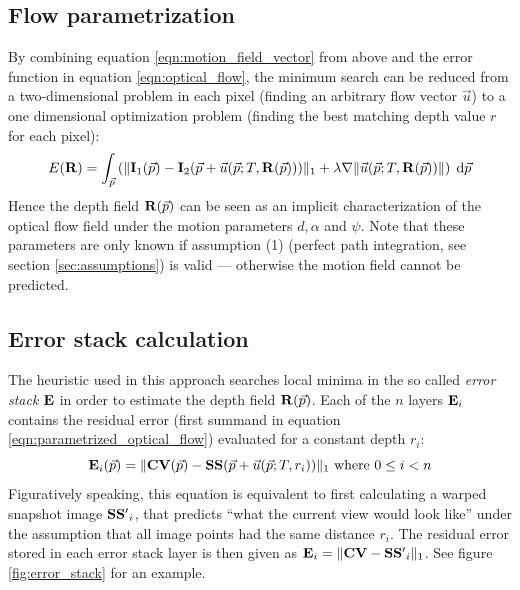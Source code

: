 \subsection{Flow parametrization}

By combining equation \ref{eqn:motion_field_vector} from above and the error function in equation \ref{eqn:optical_flow}, the minimum search can be reduced from a two-dimensional problem in each pixel (finding an arbitrary flow vector $\vec u$) to a one dimensional optimization problem (finding the best matching depth value $r$ for each pixel):
\begin{equation}
 E(\img{R}) = \int_{\vec p} \left( \|\img{I}_1(\vec p) - \img{I}_2(\vec p + \vec u(\vec p;  T, \img{R}(\vec p)))\|_1 + \lambda \nabla \| \vec u(\vec p; T, \img{R}(\vec p)) \| \right) \;\mathrm{d}\vec p\label{eqn:parametrized_optical_flow}
\end{equation}
Hence the depth field $\img{R}(\vec p)$ can be seen as an implicit characterization of the optical flow field under the motion parameters $d, \alpha$ and $\psi$. Note that these parameters are only known if assumption (1) (perfect path integration, see section \ref{sec:assumptions}) is valid --- otherwise the motion field cannot be predicted.

\subsection{Error stack calculation}

\label{sec:error_stack}

The heuristic used in this approach searches local minima in the so called \textit{error stack} $\mathbf{E}$ in order to estimate the depth field $\img{R}(\vec p)$. Each of the $n$ layers $\mathbf{E}_i$ contains the residual error (first summand in equation \ref{eqn:parametrized_optical_flow}) evaluated for a constant depth $r_i$:
\begin{equation}
 \img{E}_i(\vec p) = \|\img{CV}(\vec p) - \img{SS}(\vec p + \vec u(\vec p; T, r_i))\|_1 \text{ where }  0 \leq i < n \label{eqn:error_stack_layer}
\end{equation}
Figuratively speaking, this equation is equivalent to first calculating a warped snapshot image $\mathbf{SS'}_i$, that predicts ``what the current view would look like'' under the assumption that all image points had the same distance $r_i$. The residual error stored in each error stack layer is then given as $\mathbf{E}_i = \| \mathbf{CV} - \mathbf{SS'}_i \|_1$. See figure \ref{fig:error_stack} for an example.

